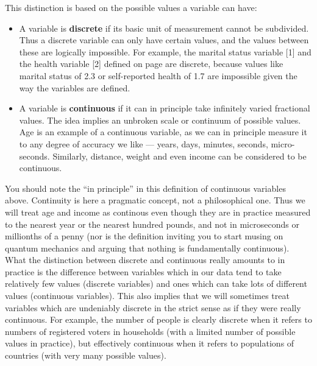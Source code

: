 This distinction is based on
the possible values a variable can have:
\begin{itemize}
\item
A variable is \textbf{discrete} if its basic unit of measurement cannot
be subdivided. Thus a discrete variable can only have certain values,
and the values between these are logically impossible.
For example, the marital status variable [1] and the health
variable [2] defined on page \pageref{p_varexample} are discrete,
because values like marital status of 2.3 or self-reported health of 1.7
are impossible given the way the variables are defined.
\item
A variable is \textbf{continuous} if it can in principle take infinitely
varied fractional values. The idea implies an unbroken scale or
continuum of possible
values. Age is an example of a continuous variable, as we can in
principle measure it to any degree of accuracy we like --- years, days,
minutes, seconds, micro-seconds. Similarly, distance, weight and even
income can be considered to be continuous.
\end{itemize}
You should note the ``in principle'' in this definition of continuous
variables above. Continuity is here a pragmatic
concept, not a philosophical one. Thus we will treat age and
income as continous even though they are in practice measured to the
nearest year or the nearest hundred pounds, and not in microseconds or
millionths of a penny (nor is the definition inviting you to start
musing on quantum mechanics and arguing that nothing is fundamentally
continuous). What the distinction between discrete and continuous really
amounts to in practice is the difference between variables which in our
data tend to take relatively few values (discrete variables) and ones
which can take lots of different values (continuous variables). This
also implies that we will sometimes treat variables which are undeniably
discrete in the strict sense as if they were really continuous. For
example, the number of people is clearly discrete when it refers to
numbers of registered voters in households (with a limited
number of possible values in practice), but effectively continuous when
it refers to populations of countries (with very many
possible values).

